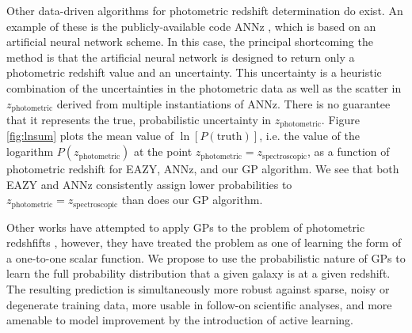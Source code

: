 \documentclass[prd,nofootbib,floatfix,11pt,tightenlines]{revtex4}
\begin{document}
Other data-driven algorithms for photometric redshift determination do exist. 
An example of these is the publicly-available code ANNz \cite{annz},
which is based on an artificial neural network scheme.
In this case, the principal
shortcoming the method is that the artificial neural network
is designed to return only a
photometric redshift value and an uncertainty.
This uncertainty is a heuristic combination of the uncertainties in the
photometric data as well as the scatter in $z_\text{photometric}$ derived
from multiple instantiations of ANNz.  There is no guarantee that it represents
the true, probabilistic uncertainty in $z_\text{photometric}$.
Figure \ref{fig:lnsum} plots the mean value of $\ln[P(\text{truth})]$,
i.e. the value of the logarithm $P(z_\text{photometric})$ at the point
$z_\text{photometric}=z_\text{spectroscopic}$, 
as a function
of photometric redshift for EAZY, ANNz, and our GP algorithm.
We see that both EAZY and ANNz consistently assign lower probabilities to
$z_\text{photometric}=z_\text{spectroscopic}$ than does our GP algorithm.

Other works have attempted to apply GPs to the problem of
photometric redshfifts \cite{kaufman,bonfield}, however, they have treated
the problem as one of learning the form of a one-to-one scalar function.
We propose to use the probabilistic nature of GPs to learn the full
probability distribution that a given galaxy is at a given redshift.  The
resulting prediction is simultaneously more robust against sparse, noisy or
degenerate training data, more usable in follow-on scientific analyses, and
more amenable to model improvement by the introduction of active learning.
\end{document}
